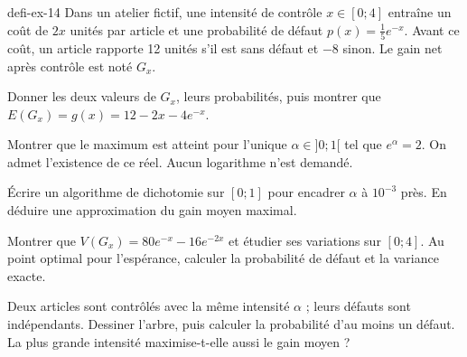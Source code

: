 \begin{blocEdition}{defi-ex-14}
Dans un atelier fictif, une intensité de contrôle $x\in[0;4]$ entraîne un coût
de $2x$ unités par article et une probabilité de défaut $p(x)=\frac15e^{-x}$.
Avant ce coût, un article rapporte 12 unités s'il est sans défaut et $-8$ sinon.
Le gain net après contrôle est noté $G_x$.
\begin{questions}
\item Donner les deux valeurs de $G_x$, leurs probabilités, puis montrer que
$E(G_x)=g(x)=12-2x-4e^{-x}$.
\item Montrer que le maximum est atteint pour l'unique $\alpha\in]0;1[$ tel que $e^\alpha=2$.
On admet l'existence de ce réel. Aucun logarithme n'est demandé.
\item Écrire un algorithme de dichotomie sur $[0;1]$ pour encadrer $\alpha$ à $10^{-3}$ près.
En déduire une approximation du gain moyen maximal.
\item Montrer que $V(G_x)=80e^{-x}-16e^{-2x}$ et étudier ses variations sur $[0;4]$.
Au point optimal pour l'espérance, calculer la probabilité de défaut et la variance exacte.
\item Deux articles sont contrôlés avec la même intensité $\alpha$ ; leurs défauts sont indépendants.
Dessiner l'arbre, puis calculer la probabilité d'au moins un défaut.
La plus grande intensité maximise-t-elle aussi le gain moyen ?
\end{questions}
\end{blocEdition}

